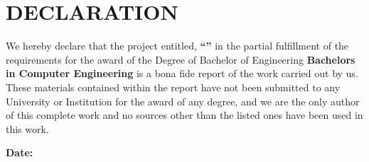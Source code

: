\cleardoublepage
{}
\chapter*{DECLARATION}
{}

\noindent We hereby declare that the project entitled, \textbf{``\cTitle''} in the partial fulfillment of the requirements for the award of the Degree of Bachelor of Engineering \textbf{Bachelors in Computer Engineering} is a bona fide report of the work carried out by us. These materials contained within the report have not been submitted to any University or Institution for the award of any degree, and we are the only author of this complete work and no sources other than the listed ones have been used in this work.

\vspace{0.5cm}

\noindent \authorTable

\noindent \textbf{Date:} \cDateFull